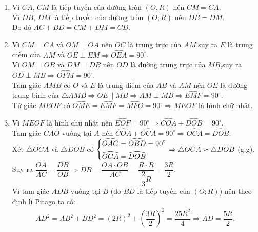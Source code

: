 \begin{bt}
{\begin{center}
		\end{center}
		\begin{enumerate}
			\item Vì $CA$, $CM$ là tiếp tuyến của đường tròn $(O,R)$ nên $CM=CA$.\\
			Vì $DB$, $DM$ là tiếp tuyến của đường tròn $(O;R)$ nên $DB=DM$.\\
			Do đó $AC+BD=CM+DM=CD$.
			\item Vì $CM=CA$ và $OM=OA$ nên $OC$ là trung trực của $AM$,suy ra $E$ là trung điểm của $AM$ và $OE\perp EM\Rightarrow \widehat{OEA}=90^\circ$.\\
			Vì $OM = OB$ và $DM=DB$ nên $OD$ là đường trung trực của $MB$,suy ra $OD\perp MB\Rightarrow \widehat{OFM}=90^\circ$.\\
			Tam giác $AMB$ có $O$ và $E$ là trung điểm của $AB$ và $AM$ nên $OE$ là đường trung bình của $\triangle AMB\Rightarrow OE\parallel MB \Rightarrow AM\perp MB\Rightarrow \widehat{EMF}=90^\circ$.\\
			Tứ giác $MEOF$ có $\widehat{OME}=\widehat{EMF}=\widehat{MFO}=90^\circ\Rightarrow MEOF$ là hình chữ nhật.
			\item Vì $MEOF$ là hình chữ nhật nên $\widehat{EOF}=90^\circ\Rightarrow \widehat{COA}+\widehat{DOB}=90^\circ$.\\
			Tam giác $CAO$ vuông tại $A$ nên $\widehat{COA}+\widehat{OCA}=90^\circ\Rightarrow \widehat{OCA}=\widehat{DOB}$.\\
			Xét $\triangle OCA$ và $\triangle DOB$ có $\left\{\begin{aligned}&\widehat{OAC}=\widehat{OBD}=90^\circ\\&\widehat{OCA}=\widehat{DOB}\end{aligned}\right.\Rightarrow \triangle OCA\backsim
			 \triangle DOB$ (g.g).\\
			Suy ra $\dfrac{OA}{AC}=\dfrac{DB}{OB}\Rightarrow DB=\dfrac{OA\cdot OB}{AC}=\dfrac{R\cdot R}{\dfrac{2}{3}R}=\dfrac{3R}{2}$.\\
			Vì tam giác $ADB$ vuông tại $B$ (do $BD$ là tiếp tuyến của $(O;R)$) nên theo định lí Pitago ta có:
			\begin{align*}
				AD^2=AB^2+BD^2=(2R)^2+\left(\dfrac{3R}{2}\right)^2=\dfrac{25R^2}{4}\Rightarrow AD = \dfrac{5R}{2}.
			\end{align*}
		\end{enumerate}
		
		
	}
\end{bt}

